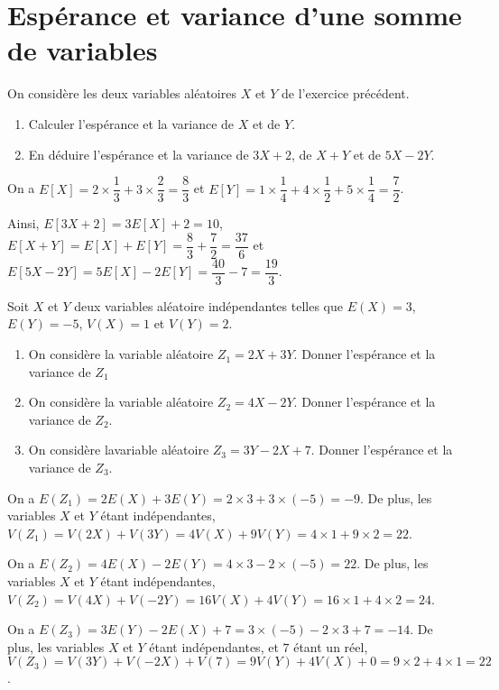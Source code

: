\documentclass[11pt,fleqn, openany]{book} %
\begin{document}
\section*{Espérance et variance d'une somme de variables}

\begin{exercise}On considère les deux variables aléatoires $X$ et $Y$ de l'exercice précédent.
\begin{enumerate}
\item Calculer l'espérance et la variance de $X$ et de $Y$.
\item En déduire l'espérance et la variance de $3X+2$, de $X+Y$ et de $5X-2Y$.
\end{enumerate}\end{exercise}

\begin{solution}On a $E[X]=2 \times \dfrac{1}{3} + 3 \times \dfrac{2}{3} = \dfrac{8}{3}$ et $E[Y]=1 \times \dfrac{1}{4}+4 \times \dfrac{1}{2} + 5 \times \dfrac{1}{4}= \dfrac{7}{2}$.

Ainsi, $E[3X+2]=3E[X]+2=10$, $E[X+Y]=E[X]+E[Y]=\dfrac{8}{3}+\dfrac{7}{2}= \dfrac{37}{6}$ et \\$E[5X-2Y]=5E[X]-2E[Y]=\dfrac{40}{3}-7=\dfrac{19}{3}$.\end{solution}




\begin{exercise}
Soit $X$ et $Y$ deux variables aléatoire indépendantes telles que $E(X)=3$, $E(Y)=-5$, $V(X)=1$ et $V(Y)=2$.
\begin{enumerate}
\item On considère la variable aléatoire $Z_1=2X+3Y$. Donner l'espérance et la variance de $Z_1$
\item On considère la variable aléatoire $Z_2=4X-2Y$. Donner l'espérance et la variance de $Z_2$.
\item On considère lavariable aléatoire $Z_3=3Y-2X+7$. Donner l'espérance et la variance de $Z_3$.
\end{enumerate}\end{exercise}

\begin{solution}On a $E(Z_1)=2E(X)+3E(Y)=2 \times 3 + 3 \times (-5)=-9$. De plus, les variables $X$ et $Y$ étant indépendantes, $V(Z_1)=V(2X)+V(3Y)=4V(X)+9V(Y)=4 \times 1 + 9 \times 2 = 22$.

On a $E(Z_2)=4E(X)-2E(Y)=4 \times 3 -2 \times (-5)=22$. De plus, les variables $X$ et $Y$ étant indépendantes, $ V(Z_2)=V(4X)+V(-2Y)=16V(X)+4V(Y)=16 \times 1 + 4 \times 2 = 24$.

On a $E(Z_3)=3E(Y)-2E(X)+7=3 \times (-5) -2 \times 3 + 7 = -14$. De plus, les variables $X$ et $Y$ étant indépendantes, et $7$ étant un réel, $V(Z_3)=V(3Y)+V(-2X)+V(7)=9V(Y)+4V(X)+0=9 \times 2 + 4 \times 1 = 22$.\end{solution}
\end{document}
